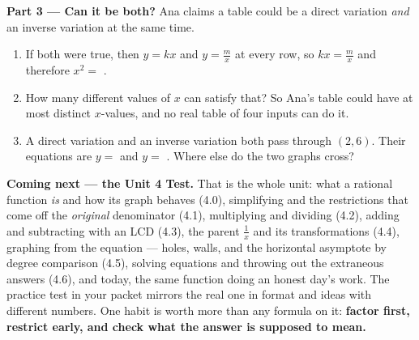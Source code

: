 \documentclass[10pt]{article}
\begin{document}
\begin{extensionbox}
\vspace{4pt}
\textbf{Part 3 --- Can it be both?} Ana claims a table could be a direct variation \emph{and} an
inverse variation at the same time.
\begin{enumerate}[label=(\alph*), leftmargin=2.1em, itemsep=4pt]
  \item If both were true, then $y=kx$ and $y=\frac mx$ at every row, so $kx=\frac mx$ and therefore
        $x^2=$ .
  \item How many different values of $x$ can satisfy that?  \; So Ana's table could
        have at most  distinct $x$-values, and no real table of four inputs can do it.
  \item A direct variation and an inverse variation both pass through $(2,6)$. Their equations are
        $y=$  and $y=$ . Where else do the two graphs cross?
\end{enumerate}
\end{extensionbox}

\begin{spiralbox}
\textbf{Coming next --- the Unit 4 Test.} That is the whole unit: what a rational function \emph{is}
and how its graph behaves (4.0), simplifying and the restrictions that come off the \emph{original}
denominator (4.1), multiplying and dividing (4.2), adding and subtracting with an LCD (4.3), the parent
$\frac1x$ and its transformations (4.4), graphing from the equation --- holes, walls, and the
horizontal asymptote by degree comparison (4.5), solving equations and throwing out the extraneous
answers (4.6), and today, the same function doing an honest day's work. The practice test in your
packet mirrors the real one in format and ideas with different numbers. One habit is worth more than
any formula on it: \textbf{factor first, restrict early, and check what the answer is supposed to
mean.}
\end{spiralbox}
\end{document}
